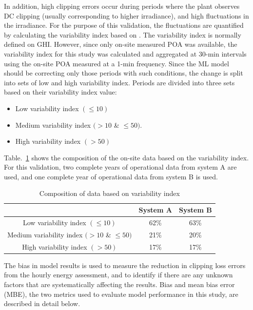 \documentclass[conference]{IEEEtran}
\begin{document}
In addition, high clipping errors occur during periods where the plant observes DC clipping (usually corresponding to higher irradiance), and high fluctuations in the irradiance. For the purpose of this validation, the fluctuations are quantified by calculating the variability index based on \cite{Stein}. The variability index is normally defined on GHI. However, since only on-site measured POA was available, the variability index for this study was calculated and aggregated at 30-min intervals using the on-site POA measured at a 1-min frequency. Since the ML model should be correcting only those periods with such conditions, the change is split into sets of low and high variability index. Periods are divided into three sets based on their variability index value:
\begin{itemize}
\item Low variability index  $(\leq10)$ 
\item Medium variability index  $(>10$ \& $\leq50)$. 
\item High variability index $(>50)$
\end{itemize}
Table.~\ref{var_index_breakdown} shows the composition of the on-site data based on the variability index. For this validation, two complete years of operational data from system A are used, and one complete year of operational data from system B is used.


\begin{table}[htbp]
\caption{Composition of data based on variability index}
\begin{center}
\begin{tabular}{ |c|c|c| } 
\hline
& System A & System B \\
\hline
Low variability index $(\leq10)$ & 62\% & 63\% \\
\hline
Medium variability index $(>10$ \& $\leq50)$ & 21\% & 20\% \\
\hline
High variability index $(>50)$ & 17\% & 17\% \\
\hline
\end{tabular}
\end{center}
\label{var_index_breakdown}
\end{table}


The bias in model results is used to measure the reduction in clipping loss errors from the hourly energy assessment, and to identify if there are any unknown factors that are systematically affecting the results. Bias and mean bias error (MBE), the two metrics used to evaluate model performance in this study, are described in detail below.
\end{document}
